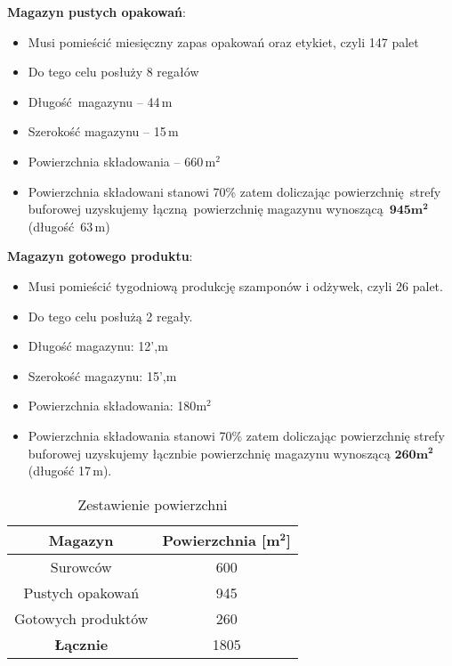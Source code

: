 \textbf{Magazyn pustych opakowań}:
\begin{itemize}
	\item Musi pomieścić miesięczny zapas opakowań oraz etykiet, czyli 147 palet
	\item Do tego celu posłuży 8 regałów
	\item Długość magazynu -- 44\,m
	\item Szerokość magazynu -- 15\,m
	\item Powierzchnia składowania -- 660\,$\mathrm{m^{2}}$
	\item Powierzchnia składowani stanowi 70\% zatem doliczając powierzchnię strefy buforowej uzyskujemy łączną powierzchnię magazynu wynoszącą $\mathbf{945m^{2}}$ (długość 63\,m)
\end{itemize}\vspace{\baselineskip}

\textbf{Magazyn gotowego produktu}:
\begin{itemize}
	\item Musi pomieścić tygodniową produkcję szamponów i odżywek, czyli 26 palet.
	\item Do tego celu posłużą 2 regały.
	\item Długość magazynu: 12',m
	\item Szerokość magazynu: 15',m
	\item Powierzchnia składowania: 180$\mathrm{m^{2}}$
	\item Powierzchnia składowania stanowi 70\% zatem doliczając powierzchnię strefy buforowej uzyskujemy łącznbie powierzchnię magazynu wynoszącą $\mathbf{260m^{2}}$ (długość 17\,m).
\end{itemize}

\begin{table}[h]
	\centering
	\caption{Zestawienie powierzchni}
	\begin{tabular}{cc}
		\hline
		\textbf{Magazyn} & \textbf{Powierzchnia [$\mathbf{m^{2}}$]} \\
		\hline\hline
		Surowców & 600 \\
		Pustych opakowań & 945 \\
		Gotowych produktów & 260 \\
		\textbf{Łącznie} & 1805 \\
		\hline
	\end{tabular}
\end{table}

